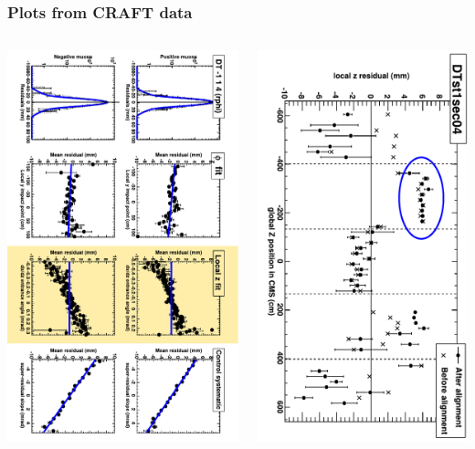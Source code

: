 \documentclass[compress]{beamer}
\begin{document}
\begin{frame}
\frametitle{Plots from CRAFT data}

\begin{columns}

\includegraphics[height=\linewidth, angle=90]{example_zpos_m1_1_4.pdf}

\includegraphics[height=\linewidth, angle=90]{example_zpos_map_1_4.pdf}


\end{columns}
\end{frame}
\end{document}
